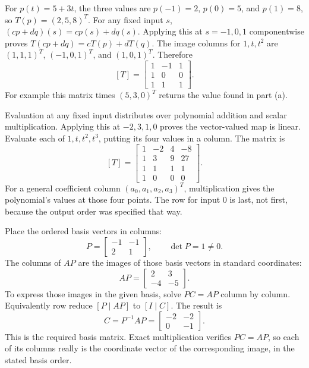  For $p(t)=5+3t$, the three values are $p(-1)=2$, $p(0)=5$, and $p(1)=8$, so $T(p)=(2,5,8)^T$.
 For any fixed input $s$, $(cp+dq)(s)=cp(s)+dq(s)$. Applying this at $s=-1,0,1$ componentwise proves $T(cp+dq)=cT(p)+dT(q)$.
 The image columns for $1,t,t^2$ are $(1,1,1)^T$, $(-1,0,1)^T$, and $(1,0,1)^T$. Therefore
\[
[T]=\begin{bmatrix}1&-1&1\\1&0&0\\1&1&1\end{bmatrix}.
\]
For example this matrix times $(5,3,0)^T$ returns the value found in part (a).

 Evaluation at any fixed input distributes over polynomial addition and scalar multiplication. Applying this at $-2,3,1,0$ proves the vector-valued map is linear.
 Evaluate each of $1,t,t^2,t^3$, putting its four values in a column. The matrix is
\[
[T]=\begin{bmatrix}1&-2&4&-8\\1&3&9&27\\1&1&1&1\\1&0&0&0\end{bmatrix}.
\]
For a general coefficient column $(a_0,a_1,a_2,a_3)^T$, multiplication gives the polynomial's values at those four points. The row for input $0$ is last, not first, because the output order was specified that way.

Place the ordered basis vectors in columns:
\[P=\begin{bmatrix}-1&-1\\2&1\end{bmatrix},\qquad\det P=1\ne0.\]
The columns of $AP$ are the images of those basis vectors in standard coordinates:
\[AP=\begin{bmatrix}2&3\\-4&-5\end{bmatrix}.\]
To express those images in the given basis, solve $PC=AP$ column by column. Equivalently row reduce $[P\mid AP]$ to $[I\mid C]$. The result is
\[C=P^{-1}AP=\begin{bmatrix}-2&-2\\0&-1\end{bmatrix}.\]
This is the required basis matrix. Exact multiplication verifies $PC=AP$, so each of its columns really is the coordinate vector of the corresponding image, in the stated basis order.


